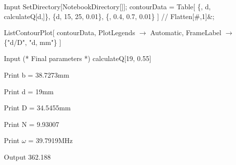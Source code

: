 \begin{mmaCell}[moredefined={contourData, calculateQ},morefunctionlocal={d},morepattern={\#}]{Input}
SetDirectory[NotebookDirectory[]];
contourData = Table[
  \{\mmaFnc{\(\gamma\)}, d, calculateQ[d,\mmaFnc{\(\gamma\)}]\},
  \{d, 15, 25, 0.01\},
  \{\mmaFnc{\(\gamma\)}, 0.4, 0.7, 0.01\}
] // Flatten[#,1]&;
  
ListContourPlot[
  contourData,
  PlotLegends \(\to\) Automatic,
  FrameLabel \(\to\) \{"d/D", "d, mm"\}
]
\end{mmaCell}

\begin{mmaCell}[moredefined={calculateQ}]{Input}
(* Final parameters *)
calculateQ[19, 0.55]
\end{mmaCell}

\begin{mmaCell}{Print}
b = 38.7273mm
\end{mmaCell}
\begin{mmaCell}{Print}
d = 19mm
\end{mmaCell}
\begin{mmaCell}{Print}
D = 34.5455mm
\end{mmaCell}
\begin{mmaCell}{Print}
N = 9.93007
\end{mmaCell}
\begin{mmaCell}{Print}
\(\omega\) = 39.7919MHz
\end{mmaCell}
\begin{mmaCell}{Output}
362.188
\end{mmaCell}